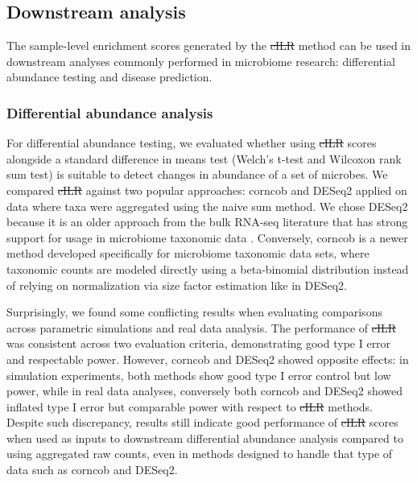 \documentclass[10pt,letterpaper]{article}
\providecommand{\DIFaddtex}[1]{{\protect\color{blue}\uwave{#1}}} %
\providecommand{\DIFdeltex}[1]{{\protect\color{red}\sout{#1}}}                      %
\providecommand{\DIFaddbegin}{} %
\providecommand{\DIFaddend}{} %
\providecommand{\DIFdelbegin}{} %
\providecommand{\DIFdelend}{} %
\providecommand{\DIFadd}[1]{\texorpdfstring{\DIFaddtex{#1}}{#1}} %
\providecommand{\DIFdel}[1]{\texorpdfstring{\DIFdeltex{#1}}{}} %
\newcommand{\DIFscaledelfig}{0.5}
\newlength{\DIFdelgraphicswidth} %
\newlength{\DIFdelgraphicsheight} %
\newcommand{\DIFaddincludegraphics}[2][]{{\color{blue}\fbox{\DIFOincludegraphics[#1]{#2}}}} %
\newcommand{\DIFdelincludegraphics}[2][]{%
\sbox{\DIFdelgraphicsbox}{\DIFOincludegraphics[#1]{#2}}%
\settoboxwidth{\DIFdelgraphicswidth}{\DIFdelgraphicsbox} %
\settoboxtotalheight{\DIFdelgraphicsheight}{\DIFdelgraphicsbox} %
\scalebox{\DIFscaledelfig}{%
\parbox[b]{\DIFdelgraphicswidth}{\usebox{\DIFdelgraphicsbox}\\[-\baselineskip] \rule{\DIFdelgraphicswidth}{0em}}\llap{\resizebox{\DIFdelgraphicswidth}{\DIFdelgraphicsheight}{%
\setlength{\unitlength}{\DIFdelgraphicswidth}%
\begin{picture}(1,1)%
\thicklines\linethickness{2pt} %
{\color[rgb]{1,0,0}\put(0,0){\framebox(1,1){}}}%
{\color[rgb]{1,0,0}\put(0,0){\line( 1,1){1}}}%
{\color[rgb]{1,0,0}\put(0,1){\line(1,-1){1}}}%
\end{picture}%
}\hspace*{3pt}}} %
} %
\DeclareRobustCommand{\DIFaddbegin}{\DIFOaddbegin \let\includegraphics\DIFaddincludegraphics} %
\DeclareRobustCommand{\DIFaddend}{\DIFOaddend \let\includegraphics\DIFOincludegraphics} %
\DeclareRobustCommand{\DIFdelbegin}{\DIFOdelbegin \let\includegraphics\DIFdelincludegraphics} %
\DeclareRobustCommand{\DIFdelend}{\DIFOaddend \let\includegraphics\DIFOincludegraphics} %
\begin{document}
\subsection*{Downstream analysis}
The sample-level enrichment scores generated by the \DIFdelbegin \DIFdel{cILR }\DIFdelend \DIFaddbegin \DIFadd{CBEA }\DIFaddend method can be used in downstream analyses commonly performed in microbiome research: differential abundance testing and disease prediction.

\subsubsection*{Differential abundance analysis}
For differential abundance testing, we evaluated whether using \DIFdelbegin \DIFdel{cILR }\DIFdelend \DIFaddbegin \DIFadd{CBEA }\DIFaddend scores alongside a standard difference in means test (Welch's t-test and Wilcoxon rank sum test) is suitable to detect changes in abundance of a set of microbes. We compared \DIFdelbegin \DIFdel{cILR }\DIFdelend \DIFaddbegin \DIFadd{CBEA }\DIFaddend against two popular approaches: corncob \cite{martin2020} and DESeq2 \cite{love2014} applied on data where taxa were aggregated using the naive sum method. We chose DESeq2 because it is an older approach from the bulk RNA-seq literature that has strong support for usage in microbiome taxonomic data \cite{mcmurdie2014}. Conversely, corncob is a newer method developed specifically for microbiome taxonomic data sets, where taxonomic counts are modeled directly using a beta-binomial distribution instead of relying on normalization via size factor estimation like in DESeq2. 

Surprisingly, we found some conflicting results when evaluating comparisons across parametric simulations and real data analysis. The performance of \DIFdelbegin \DIFdel{cILR }\DIFdelend \DIFaddbegin \DIFadd{CBEA }\DIFaddend was consistent across two evaluation criteria, demonstrating good type I error and respectable power. However, corncob and DESeq2 showed opposite effects: in simulation experiments, both methods show good type I error control but low power, while in real data analyses, conversely both corncob and DESeq2 showed inflated type I error but comparable power with respect to \DIFdelbegin \DIFdel{cILR }\DIFdelend \DIFaddbegin \DIFadd{CBEA }\DIFaddend methods. Despite such discrepancy, results still indicate good performance of \DIFdelbegin \DIFdel{cILR }\DIFdelend \DIFaddbegin \DIFadd{CBEA }\DIFaddend scores when used as inputs to downstream differential abundance analysis compared to using aggregated raw counts, even in methods designed to handle that type of data such as corncob and DESeq2.
\end{document}
